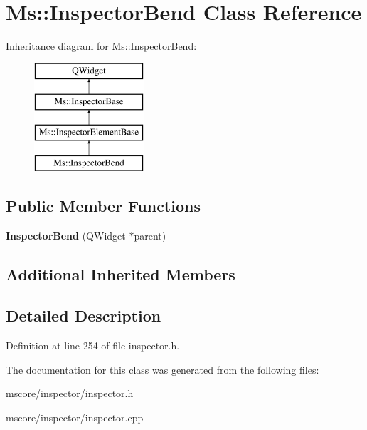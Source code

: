 \hypertarget{class_ms_1_1_inspector_bend}{}\section{Ms\+:\+:Inspector\+Bend Class Reference}
\label{class_ms_1_1_inspector_bend}
Inheritance diagram for Ms\+:\+:Inspector\+Bend\+:\begin{figure}[H]
\begin{center}
\leavevmode
\includegraphics[height=4.000000cm]{class_ms_1_1_inspector_bend}
\end{center}
\end{figure}
\subsection*{Public Member Functions}
\begin{DoxyCompactItemize}
\item 
\mbox{\label{class_ms_1_1_inspector_bend_a047ff881ad8bdc38317778bc065af1df}} 
{\bfseries Inspector\+Bend} (Q\+Widget $\ast$parent)
\end{DoxyCompactItemize}
\subsection*{Additional Inherited Members}


\subsection{Detailed Description}


Definition at line 254 of file inspector.\+h.



The documentation for this class was generated from the following files\+:\begin{DoxyCompactItemize}
\item 
mscore/inspector/inspector.\+h\item 
mscore/inspector/inspector.\+cpp\end{DoxyCompactItemize}
